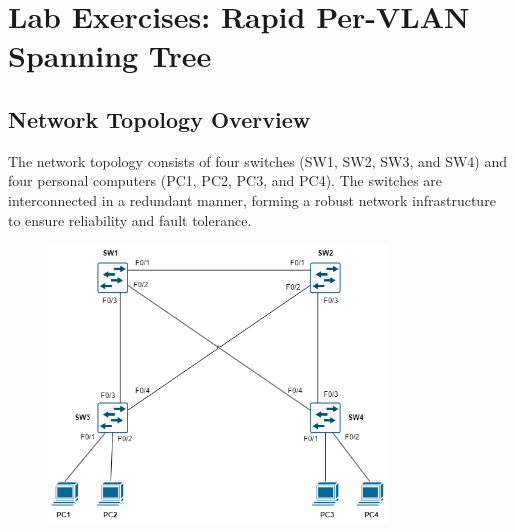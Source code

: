 \documentclass[a4paper]{book}
\begin{document}
\newpage


\section*{Lab Exercises: Rapid Per-VLAN Spanning Tree}


\subsection{Network Topology Overview}

The network topology consists of four switches (SW1, SW2, SW3, and SW4) and four personal computers (PC1, PC2, PC3, and PC4). The switches are interconnected in a redundant manner, forming a robust network infrastructure to ensure reliability and fault tolerance.
\begin{figure}[h]
	\centering
	\includegraphics[width=0.8\textwidth]{img/rstp.png}
	\caption{\textit{}}
\end{figure}
\end{document}
